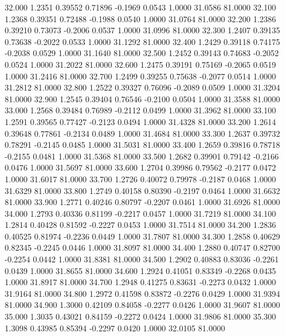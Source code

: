   32.000   1.2351   0.39552   0.71896  -0.1969   0.0543   1.0000  31.0586  81.0000
  32.100   1.2368   0.39351   0.72488  -0.1988   0.0540   1.0000  31.0764  81.0000
  32.200   1.2386   0.39210   0.73073  -0.2006   0.0537   1.0000  31.0996  81.0000
  32.300   1.2407   0.39135   0.73638  -0.2022   0.0533   1.0000  31.1292  81.0000
  32.400   1.2429   0.39118   0.74175  -0.2038   0.0529   1.0000  31.1640  81.0000
  32.500   1.2452   0.39143   0.74683  -0.2052   0.0524   1.0000  31.2022  81.0000
  32.600   1.2475   0.39191   0.75169  -0.2065   0.0519   1.0000  31.2416  81.0000
  32.700   1.2499   0.39255   0.75638  -0.2077   0.0514   1.0000  31.2812  81.0000
  32.800   1.2522   0.39327   0.76096  -0.2089   0.0509   1.0000  31.3204  81.0000
  32.900   1.2545   0.39404   0.76546  -0.2100   0.0504   1.0000  31.3588  81.0000
  33.000   1.2568   0.39484   0.76989  -0.2112   0.0499   1.0000  31.3962  81.0000
  33.100   1.2591   0.39565   0.77427  -0.2123   0.0494   1.0000  31.4328  81.0000
  33.200   1.2614   0.39648   0.77861  -0.2134   0.0489   1.0000  31.4684  81.0000
  33.300   1.2637   0.39732   0.78291  -0.2145   0.0485   1.0000  31.5031  81.0000
  33.400   1.2659   0.39816   0.78718  -0.2155   0.0481   1.0000  31.5368  81.0000
  33.500   1.2682   0.39901   0.79142  -0.2166   0.0476   1.0000  31.5697  81.0000
  33.600   1.2704   0.39986   0.79562  -0.2177   0.0472   1.0000  31.6017  81.0000
  33.700   1.2726   0.40072   0.79978  -0.2187   0.0468   1.0000  31.6329  81.0000
  33.800   1.2749   0.40158   0.80390  -0.2197   0.0464   1.0000  31.6632  81.0000
  33.900   1.2771   0.40246   0.80797  -0.2207   0.0461   1.0000  31.6926  81.0000
  34.000   1.2793   0.40336   0.81199  -0.2217   0.0457   1.0000  31.7219  81.0000
  34.100   1.2814   0.40428   0.81592  -0.2227   0.0453   1.0000  31.7514  81.0000
  34.200   1.2836   0.40525   0.81974  -0.2236   0.0449   1.0000  31.7807  81.0000
  34.300   1.2858   0.40629   0.82345  -0.2245   0.0446   1.0000  31.8097  81.0000
  34.400   1.2880   0.40747   0.82700  -0.2254   0.0442   1.0000  31.8381  81.0000
  34.500   1.2902   0.40883   0.83036  -0.2261   0.0439   1.0000  31.8655  81.0000
  34.600   1.2924   0.41051   0.83349  -0.2268   0.0435   1.0000  31.8917  81.0000
  34.700   1.2948   0.41275   0.83631  -0.2273   0.0432   1.0000  31.9164  81.0000
  34.800   1.2972   0.41598   0.83872  -0.2276   0.0429   1.0000  31.9394  81.0000
  34.900   1.3000   0.42109   0.84058  -0.2277   0.0426   1.0000  31.9607  81.0000
  35.000   1.3035   0.43021   0.84159  -0.2272   0.0424   1.0000  31.9806  81.0000
  35.300   1.3098   0.43985   0.85394  -0.2297   0.0420   1.0000  32.0105  81.0000
